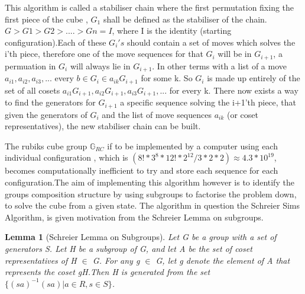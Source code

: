 \documentclass{article}
\newtheorem{lemma}[section]{Lemma}
\begin{document}
This algorithm is called a stabiliser chain where the first permutation fixing the first piece of the cube , $G_{1}$ shall be defined as the stabiliser of the chain.  $G > G1 > G2 > .... > Gn = I$, where I is the identity (starting configuration).Each of these $G_{i}'s$ should contain a set of moves which solves the i'th piece, therefore one of the move sequences for that $G_{i}$ will be in $G_{i+1}$, a permuation in $G_{i}$ will always lie in $G_{i+1}$. In other terms with a list  of a move $a_{i1},a_{i2},a_{i3}, ...$ every $b \in G_{i} \in a_{ik}G_{i+1}$ for some k. So $G_{i}$ is made up entirely of the set of all cosets $a_{i1}G_{i+1}, a_{i2}G_{i+1}, a_{i3}G_{i+1}, ... $ for every k. There now exists a way to find the generators for $G_{i+1}$ a specific sequence solving the i+1'th piece, that given the generators of $G_{i}$ and the list of move sequences $a_{ik}$ (or coset representatives), the new stabiliser chain can be built.%

The rubiks cube group $\mathbb{G}_{RC}$ if to be implemented by a computer using each individual configuration , which is $(8!*3^8*12!*2^12/3*2*2) \approx 4.3*10^{19}$, becomes computationally inefficient to try and store each sequence for each configuration.The aim of implementing this algorithm however is to identify the groups composition structure by using subgroups to factorise the problem down, to solve the cube from a given state. The algorithm in question the Schreier Sims Algorithm, is given motivation from the Schreier Lemma on subgroups.

\begin{lemma}[Schreier Lemma on Subgroups]
Let G be a group with a set of generators S. Let H be a subgroup of G, and let A be the set of coset representatives of H $\in$ G. For any g $\in$ G, let g denote the element of A that represents the coset gH.\newline Then H is generated from the set $\{(sa)^{-1} (sa) | a \in R, s \in S \}$. 
\end{lemma}
\end{document}
